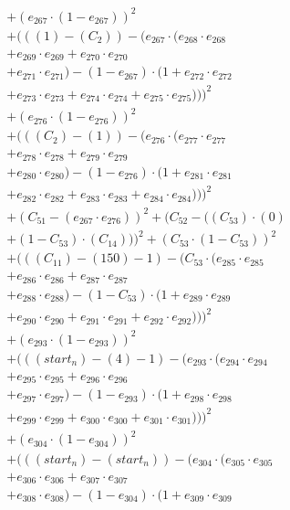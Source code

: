 \documentclass[10pt, a4paper]{article}
\begin{document}
\begin{align*}
& + (e_{267} \cdot (1 - e_{267}))^{2} \\
& + (((1) - (C_{2})) - (e_{267} \cdot (e_{268} \cdot e_{268} \\
& + e_{269} \cdot e_{269} + e_{270} \cdot e_{270} \\
& + e_{271} \cdot e_{271}) - (1 - e_{267}) \cdot (1 + e_{272} \cdot e_{272} \\
& + e_{273} \cdot e_{273} + e_{274} \cdot e_{274} + e_{275} \cdot e_{275})))^{2} \\
& + (e_{276} \cdot (1 - e_{276}))^{2} \\
& + (((C_{2}) - (1)) - (e_{276} \cdot (e_{277} \cdot e_{277} \\
& + e_{278} \cdot e_{278} + e_{279} \cdot e_{279} \\
& + e_{280} \cdot e_{280}) - (1 - e_{276}) \cdot (1 + e_{281} \cdot e_{281} \\
& + e_{282} \cdot e_{282} + e_{283} \cdot e_{283} + e_{284} \cdot e_{284})))^{2} \\
& + (C_{51} - (e_{267} \cdot e_{276}))^{2} + (C_{52} - ((C_{53})  \cdot  (0) \\
& + (1 - C_{53})  \cdot  (C_{14})))^{2} + (C_{53} \cdot (1 - C_{53}))^{2} \\
& + (((C_{11}) - (150) - 1) - (C_{53} \cdot (e_{285} \cdot e_{285} \\
& + e_{286} \cdot e_{286} + e_{287} \cdot e_{287} \\
& + e_{288} \cdot e_{288}) - (1 - C_{53}) \cdot (1 + e_{289} \cdot e_{289} \\
& + e_{290} \cdot e_{290} + e_{291} \cdot e_{291} + e_{292} \cdot e_{292})))^{2} \\
& + (e_{293} \cdot (1 - e_{293}))^{2} \\
& + (((start_n) - (4) - 1) - (e_{293} \cdot (e_{294} \cdot e_{294} \\
& + e_{295} \cdot e_{295} + e_{296} \cdot e_{296} \\
& + e_{297} \cdot e_{297}) - (1 - e_{293}) \cdot (1 + e_{298} \cdot e_{298} \\
& + e_{299} \cdot e_{299} + e_{300} \cdot e_{300} + e_{301} \cdot e_{301})))^{2} \\
& + (e_{304} \cdot (1 - e_{304}))^{2} \\
& + (((start_n) - (start_n)) - (e_{304} \cdot (e_{305} \cdot e_{305} \\
& + e_{306} \cdot e_{306} + e_{307} \cdot e_{307} \\
& + e_{308} \cdot e_{308}) - (1 - e_{304}) \cdot (1 + e_{309} \cdot e_{309} \\

\end{align*}
\end{document}
